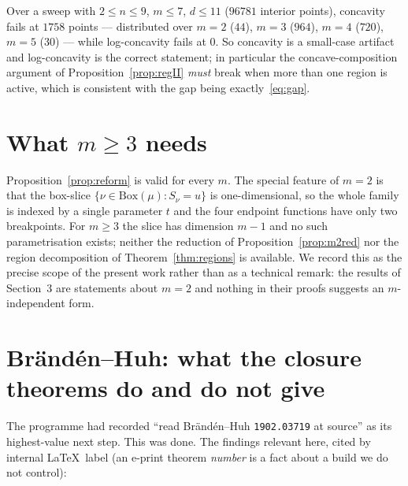 \documentclass[11pt]{article}
\theoremstyle{plain}
\theoremstyle{definition}
\newcommand{\Bx}{\mathrm{Box}}
\begin{document}
Over a sweep with $2\le n\le9$, $m\le7$, $d\le11$ ($96781$ interior points), concavity
fails at $1758$ points --- distributed over $m=2$ ($44$), $m=3$ ($964$), $m=4$ ($720$),
$m=5$ ($30$) --- while log-concavity fails at $0$. So concavity is a small-case artifact
and log-concavity is the correct statement; in particular the concave-composition argument
of Proposition~\ref{prop:regII} \emph{must} break when more than one region is active,
which is consistent with the gap being exactly~\eqref{eq:gap}.

\section{What $m\ge3$ needs}

Proposition~\ref{prop:reform} is valid for every $m$. The special feature of $m=2$ is that
the box-slice $\{\nu\in\Bx(\mu):S_\nu=u\}$ is one-dimensional, so the whole family is
indexed by a single parameter $t$ and the four endpoint functions have only two
breakpoints. For $m\ge3$ the slice has dimension $m-1$ and no such parametrisation exists;
neither the reduction of Proposition~\ref{prop:m2red} nor the region decomposition of
Theorem~\ref{thm:regions} is available. We record this as the precise scope of the present
work rather than as a technical remark: the results of Section~3 are statements about
$m=2$ and nothing in their proofs suggests an $m$-independent form.

\section{Brändén--Huh: what the closure theorems do and do not give}

The programme had recorded ``read Brändén--Huh \texttt{1902.03719} at source'' as its
highest-value next step. This was done. The findings relevant here, cited by internal
\LaTeX\ label (an e-print theorem \emph{number} is a fact about a build we do not control):
\end{document}
